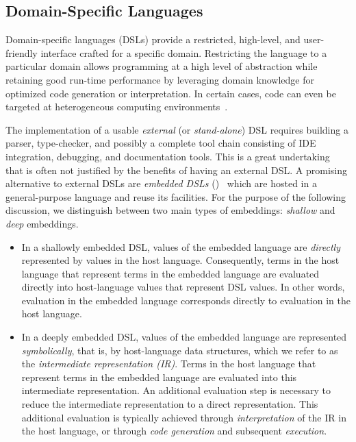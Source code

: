 \subsection{Domain-Specific Languages}
\label{sec:domain-specific-languages}

Domain-specific languages (DSLs) provide a restricted,
high-level, and user-friendly interface crafted for a specific domain.
Restricting the language to a particular domain allows programming at
a high level of abstraction while retaining good run-time performance
by leveraging domain knowledge for optimized code generation or
interpretation.  In certain cases, code can even be targeted at
heterogeneous computing environments~\cite{rompf_optimizing_2013}.


The implementation of a usable \emph{external} (or \emph{stand-alone})
DSL requires building a parser, type-checker, and possibly a complete
tool chain consisting of IDE integration, debugging, and documentation
tools. This is a great undertaking that is often not justified by the
benefits of having an external DSL.  A promising alternative to
external DSLs are \emph{embedded DSLs} (\edsls)~\cite{Hudak96csur}
which are hosted in a general-purpose language and reuse its
facilities. For the purpose of the following discussion, we
distinguish between two main types of embeddings: \emph{shallow} and
\emph{deep} embeddings.

  \begin{itemize}
  \item In a shallowly embedded DSL, values of the embedded language
    are \emph{directly} represented by values in the host language.
    Consequently, terms in the host language that represent terms in
    the embedded language are evaluated directly into host-language
    values that represent DSL values. In other words, evaluation in
    the embedded language corresponds directly to evaluation in the
    host language.
  \item In a deeply embedded DSL, values of the embedded language are
    represented \emph{symbolically}, that is, by host-language data
    structures, which we refer to as the \emph{intermediate
      representation (IR)}. Terms in the host language that represent
    terms in the embedded language are evaluated into this intermediate
    representation. An additional evaluation step is necessary to
    reduce the intermediate representation to a direct representation.
    This additional evaluation is typically achieved through
    \emph{interpretation} of the IR in the host language, or through
    \emph{code generation} and subsequent \emph{execution}.
  \end{itemize}

